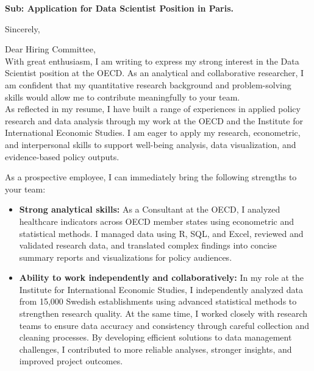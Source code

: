 \documentclass[11pt,a4paper,roman]{moderncv}
\begin{document}
\date{\today}
\opening{\textbf{Sub: Application for Data Scientist Position in Paris.}}
\closing{Sincerely, \vspace{-1em}}


\makelettertitle



Dear Hiring Committee,
\\
\vspace{1em}
With great enthusiasm, I am writing to express my strong interest in the Data Scientist position at the OECD. As an analytical and collaborative researcher, I am confident that my quantitative research background and problem-solving skills would allow me to contribute meaningfully to your team.\\

\vspace{1em}
As reflected in my resume, I have built a range of experiences in applied policy research and data analysis through my work at the OECD and the Institute for International Economic Studies. I am eager to apply my research, econometric, and interpersonal skills to support well-being analysis, data visualization, and evidence-based policy outputs.\\
\vspace{1em}

As a prospective employee, I can immediately bring the following strengths to your team:
\vspace{0.5em}
\begin{itemize}
\item \textbf{Strong analytical skills:} As a Consultant at the OECD, I analyzed healthcare indicators across OECD member states using econometric and statistical methods. I managed data using R, SQL, and Excel, reviewed and validated research data, and translated complex findings into concise summary reports and visualizations for policy audiences.
\item \textbf{Ability to work independently and collaboratively:} In my role at the Institute for International Economic Studies, I independently analyzed data from 15,000 Swedish establishments using advanced statistical methods to strengthen research quality. At the same time, I worked closely with research teams to ensure data accuracy and consistency through careful collection and cleaning processes. By developing efficient solutions to data management challenges, I contributed to more reliable analyses, stronger insights, and improved project outcomes.
\end{itemize}
\end{document}
